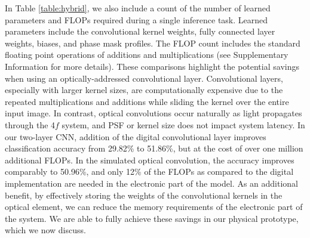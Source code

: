 \documentclass[fleqn,10pt]{wlscirep}
\begin{document}
In Table \ref{table:hybrid}, we also include a count of the number of learned parameters and FLOPs required during a single inference task. Learned parameters include the convolutional kernel weights, fully connected layer weights, biases, and phase mask profiles. The FLOP count includes the standard floating point operations of additions and multiplications (see Supplementary Information for more details). These comparisons highlight the potential savings when using an optically-addressed convolutional layer. Convolutional layers, especially with larger kernel sizes, are computationally expensive due to the repeated multiplications and additions while sliding the kernel over the entire input image. In contrast, optical convolutions occur naturally as light propagates through the 4$f$ system, and PSF or kernel size does not impact system latency. In our two-layer CNN, addition of the digital convolutional layer improves classification accuracy from 29.82\% to 51.86\%, but at the cost of over one million additional FLOPs. In the simulated optical convolution, the accuracy improves comparably to 50.96\%, and only 12\% of the FLOPs as compared to the digital implementation are needed in the electronic part of the model. As an additional benefit, by effectively storing the weights of the convolutional kernels in the optical element, we can reduce the memory requirements of the electronic part of the system. We are able to fully achieve these savings in our physical prototype, which we now discuss.
\end{document}
